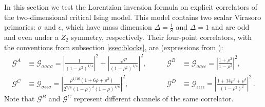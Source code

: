 \documentclass[11pt, reqno,preprint]{article}
\def\be{\begin{equation}}
\def\ee{\end{equation}}
\def\epsa{\epsilon}  %
\def\GG{\mathcal{G}}
\begin{document}
\begin{appendix}
In this section we test the Lorentzian inversion formula on explicit correlators
of the two-dimensional critical Ising model.  This model contains two scalar Virasoro primaries:
$\sigma$ and $\epsa$, which have mass dimension $\Delta=\frac18$ and $\Delta=1$
and are odd and even under a $Z_2$ symmetry, respectively.
Their four-point correlators, with the conventions from subsection \ref{ssec:blocks},
are \cite{Belavin:1984vu} (expressions from \cite{Ardonne:2010hj}):
\be\begin{aligned}
 \GG^A&\equiv \GG_{\sigma\sigma\sigma\sigma} = \left|\frac{1}{(1-\rho^2)^{1/4}}\right|^2+\left|\frac{\sqrt{\rho}}{(1-\rho^2)^{1/4}}\right|^2,
& \qquad
 \GG^B&\equiv \GG_{\sigma\sigma\epsa\epsa}= \left|\frac{1+\rho^2}{1-\rho^2}\right|^2, \\
 \GG^C&\equiv \GG_{\sigma\epsa\epsa\sigma}= \left|\frac{\rho^{1/16}(1+6\rho+\rho^2)}{2^{7/8}(1-\rho)^2(1+\rho)^{1/8}}\right|^2,
 &\qquad
 \GG^D&\equiv \GG_{\epsa\epsa\epsa\epsa}= \left|\frac{1+14\rho^2+\rho^4}{(1-\rho^2)^2}\right|^2\,. \label{Ising}
\end{aligned}\ee
Note that $\GG^B$ and $\GG^C$ represent different channels of the same correlator.


\end{appendix}
\end{document}
